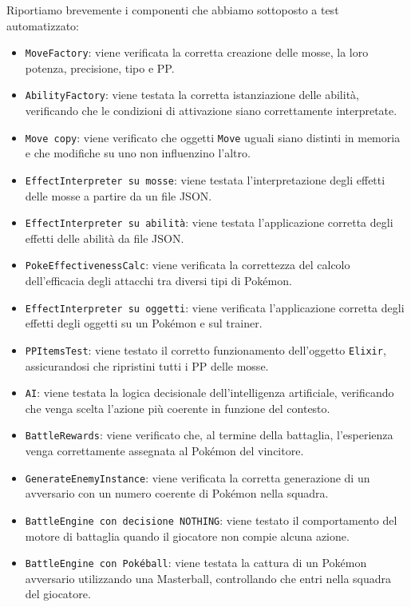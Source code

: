 \documentclass[a4paper,12pt]{report}
\begin{document}
{{Riportiamo brevemente i componenti che abbiamo sottoposto a test automatizzato:
\begin{itemize}
    \item \texttt{MoveFactory}: viene verificata la corretta creazione delle mosse, la loro potenza, precisione, tipo e PP.
    \item \texttt{AbilityFactory}: viene testata la corretta istanziazione delle abilità, verificando che le condizioni di attivazione siano correttamente interpretate.
    \item \texttt{Move copy}: viene verificato che oggetti \texttt{Move} uguali siano distinti in memoria e che modifiche su uno non influenzino l'altro.
    \item \texttt{EffectInterpreter su mosse}: viene testata l'interpretazione degli effetti delle mosse a partire da un file JSON.
    \item \texttt{EffectInterpreter su abilità}: viene testata l'applicazione corretta degli effetti delle abilità da file JSON.
    \item \texttt{PokeEffectivenessCalc}: viene verificata la correttezza del calcolo dell’efficacia degli attacchi tra diversi tipi di Pokémon.
    \item \texttt{EffectInterpreter su oggetti}: viene verificata l’applicazione corretta degli effetti degli oggetti su un Pokémon e sul trainer.
    \item \texttt{PPItemsTest}: viene testato il corretto funzionamento dell’oggetto \texttt{Elixir}, assicurandosi che ripristini tutti i PP delle mosse.
    \item \texttt{AI}: viene testata la logica decisionale dell'intelligenza artificiale, verificando che venga scelta l’azione più coerente in funzione del contesto.
    \item \texttt{BattleRewards}: viene verificato che, al termine della battaglia, l’esperienza venga correttamente assegnata al Pokémon del vincitore.
    \item \texttt{GenerateEnemyInstance}: viene verificata la corretta generazione di un avversario con un numero coerente di Pokémon nella squadra.
    \item \texttt{BattleEngine con decisione NOTHING}: viene testato il comportamento del motore di battaglia quando il giocatore non compie alcuna azione.
    \item \texttt{BattleEngine con Pokéball}: viene testata la cattura di un Pokémon avversario utilizzando una Masterball, controllando che entri nella squadra del giocatore.

\end{itemize}}}
\end{document}
